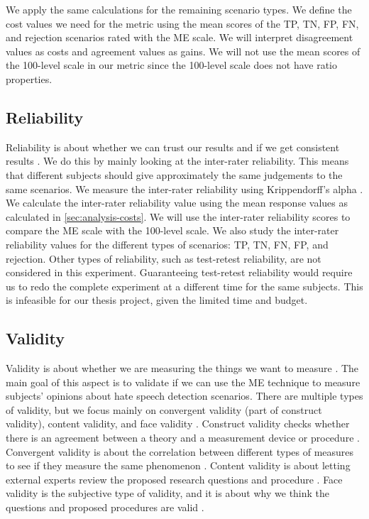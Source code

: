 \documentclass[a4paper]{article}
\begin{document}
We apply the same calculations for the remaining scenario types. We define the cost values we need for the metric using the mean scores of the TP, TN, FP, FN, and rejection scenarios rated with the ME scale. We will interpret disagreement values as costs and agreement values as gains. We will not use the mean scores of the 100-level scale in our metric since the 100-level scale does not have ratio properties.

\subsection{Reliability}
Reliability is about whether we can trust our results and if we get consistent results \cite{fitzner2007reliability}. We do this by mainly looking at the inter-rater reliability. This means that different subjects should give approximately the same judgements to the same scenarios. We measure the inter-rater reliability using Krippendorff's alpha \cite{maddalena2017crowdsourcing, krippendorff2004reliability}. We calculate the inter-rater reliability value using the mean response values as calculated in \ref{sec:analysis-costs}. We will use the inter-rater reliability scores to compare the ME scale with the 100-level scale. We also study the inter-rater reliability values for the different types of scenarios: TP, TN, FN, FP, and rejection. Other types of reliability, such as test-retest reliability, are not considered in this experiment. Guaranteeing test-retest reliability would require us to redo the complete experiment at a different time for the same subjects. This is infeasible for our thesis project, given the limited time and budget.

\subsection{Validity}
\label{sec:analysis-validity}
Validity is about whether we are measuring the things we want to measure \cite{fitzner2007reliability}. The main goal of this aspect is to validate if we can use the ME technique to measure subjects' opinions about hate speech detection scenarios. There are multiple types of validity, but we focus mainly on convergent validity (part of construct validity), content validity, and face validity \cite{fitzner2007reliability}. Construct validity checks whether there is an agreement between a theory and a measurement device or procedure \cite{fitzner2007reliability}. Convergent validity is about the correlation between different types of measures to see if they measure the same phenomenon \cite{fitzner2007reliability}. Content validity is about letting external experts review the proposed research questions and procedure \cite{fitzner2007reliability}. Face validity is the subjective type of validity, and it is about why we think the questions and proposed procedures are valid \cite{fitzner2007reliability}.
\end{document}
